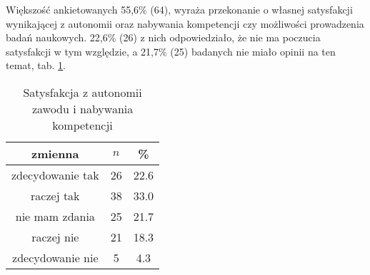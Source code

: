 

Większość ankietowanych 55,6\% (64), wyraża przekonanie o własnej satysfakcji wynikającej z autonomii oraz nabywania kompetencji czy możliwości prowadzenia badań naukowych. 22,6\% (26) z nich odpowiedziało, że nie ma poczucia satysfakcji w tym względzie, a 21,7\% (25) badanych nie miało opinii na ten temat, tab. \ref{tab:Q20}.



\begin{table}[H]
\caption{Satysfakcja z autonomii zawodu i nabywania kompetencji}
\centering
\begin{tabular}{ | c | c | c |}
\hline
zmienna & $n$ & \% \\
\hline
zdecydowanie tak  &  26  & 22.6 \\
\hline
raczej tak  &  38  & 33.0\\
\hline
nie mam zdania  &  25  & 21.7\\
\hline
raczej nie  &  21  & 18.3 \\
\hline
zdecydowanie nie  &  5  & 4.3\\
\hline
\end{tabular}
\label{tab:Q20}
\end{table}


